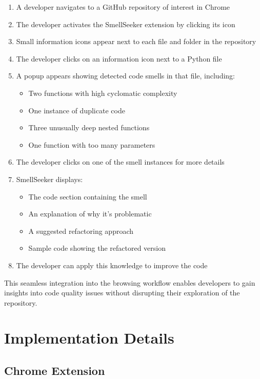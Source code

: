 \documentclass[sigconf,screen]{acmart}
\begin{document}
\begin{enumerate}
    \item A developer navigates to a GitHub repository of interest in Chrome
    \item The developer activates the SmellSeeker extension by clicking its icon
    \item Small information icons appear next to each file and folder in the repository
    \item The developer clicks on an information icon next to a Python file
    \item A popup appears showing detected code smells in that file, including:
        \begin{itemize}
            \item Two functions with high cyclomatic complexity
            \item One instance of duplicate code
            \item Three unusually deep nested functions
            \item One function with too many parameters
        \end{itemize}
    \item The developer clicks on one of the smell instances for more details
    \item SmellSeeker displays:
        \begin{itemize}
            \item The code section containing the smell
            \item An explanation of why it's problematic
            \item A suggested refactoring approach
            \item Sample code showing the refactored version
        \end{itemize}
    \item The developer can apply this knowledge to improve the code
\end{enumerate}

This seamless integration into the browsing workflow enables developers to gain insights into code quality issues without disrupting their exploration of the repository.

\section{Implementation Details}

\subsection{Chrome Extension}
\end{document}

